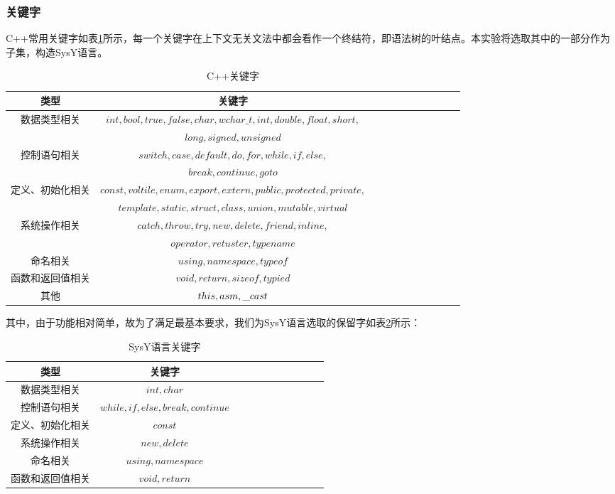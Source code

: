 \documentclass[UTF8,a4paper,10pt]{ctexart}
\begin{document}
\subsubsection{关键字}C++常用关键字如表\ref{fig:1}所示，每一个关键字在上下文无关文法中都会看作一个终结符，即语法树的叶结点。本实验将选取其中的一部分作为子集，构造SysY语言。
\begin{table}[!htbp]
  \centering
  \begin{tabular}{ccccccccccc}
  \toprule  
  类型& 关键字&\\
  \midrule
  数据类型相关&$int,bool,true,false,char,wchar\_t,int,double,float,short,$&\\
  & $long,signed,unsigned$&\\
  控制语句相关&$switch, case, default, do, for, while, if, else,$&\\
  & $break, continue, goto$&\\
  定义、初始化相关& $const, voltile, enum, export, extern, public, protected, private,$&\\ 
   & $template, static, struct, class, union, mutable, virtual$&\\
  系统操作相关& $catch, throw, try, new, delete, friend, inline, $&\\
  & $operator, retuster, typename$&\\
  命名相关& $using, namespace, typeof$&\\
  函数和返回值相关& $void, return, sizeof, typied$&\\
  其他& $this, asm, \*\_cast$&\\
  \bottomrule
  \end{tabular}
  \caption{C++关键字}
  \label{fig:1}
\end{table}
\par
其中，由于功能相对简单，故为了满足最基本要求，我们为SysY语言选取的保留字如表\ref{fig:2}所示：
\begin{table}[!htbp]
  \centering
  \begin{tabular}{ccccccccccc}
  \toprule  
  类型& 关键字&\\
  \midrule
  数据类型相关&$int,char$&\\
  控制语句相关&$while, if, else, break, continue$&\\
  定义、初始化相关& $const$&\\ 
  系统操作相关& $new, delete$&\\
  命名相关& $using, namespace$&\\
  函数和返回值相关& $void, return$&\\
  \bottomrule
  \end{tabular}
  \caption{SysY语言关键字}
  \label{fig:2}
\end{table}
\end{document}
